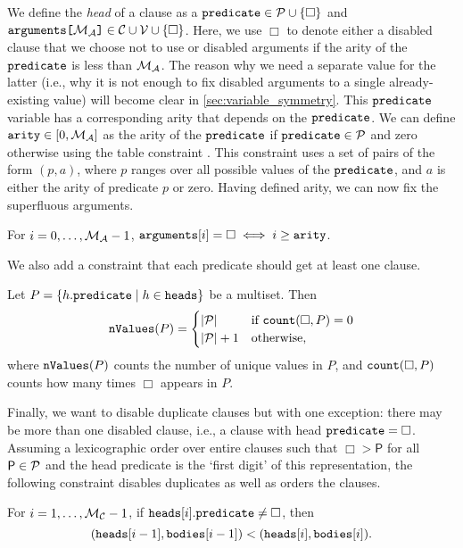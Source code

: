 We define the \emph{head} of a clause as a $\texttt{\textup{predicate}} \in \mathcal{P}{}
\cup \{ \Box \}$ and $\texttt{\textup{{arguments}[}}{\mathcal{M}_{\mathcal{A}}{}}\texttt{\textup{]}} \in {\mathcal{C}{} \cup
  \mathcal{V}{}} \cup \{ \Box \}$. Here, we use $\Box$ to denote either a
disabled clause that we choose not to use or disabled arguments if the arity of
the $\texttt{\textup{predicate}}$ is less than $\mathcal{M}_{\mathcal{A}}{}$. The reason why we need a
separate value for the latter (i.e., why it is not enough to fix disabled
arguments to a single already-existing value) will become clear in
\cref{sec:variable_symmetry}. This $\texttt{\textup{predicate}}$ variable has a
corresponding arity that depends on the $\texttt{\textup{predicate}}$. We can
define $\texttt{\textup{arity}} \in [0, \mathcal{M}_{\mathcal{A}}{}]$ as the arity of the
$\texttt{\textup{predicate}}$ if $\texttt{\textup{predicate}} \in \mathcal{P}{}$ and zero
otherwise using the table constraint \citep{DBLP:conf/cpaior/MairyDL15}. This
constraint uses a set of pairs of the form $(p, a)$, where $p$ ranges over all
possible values of the $\texttt{\textup{predicate}}$, and $a$ is either the arity of
predicate $p$ or zero. Having defined arity, we can now fix the superfluous
arguments.
\begin{constraint} \label{constr:arity}
  For $i = 0, \dots, \mathcal{M}_{\mathcal{A}}{} - 1$, $\texttt{\textup{arguments}}[i] = \Box \iff i
  \ge \texttt{\textup{arity}}$.
\end{constraint}
We also add a constraint that each predicate should get at least one clause.
\begin{constraint}
  Let $P = \{ h.\texttt{\textup{predicate}} \mid h \in \texttt{\textup{heads}} \}$ be a
  multiset. Then
  \[
    \texttt{\textup{nValues}}(P) = \begin{cases}
      |\mathcal{P}{}| & \text{if } \texttt{\textup{count}}(\Box, P) = 0 \\
      |\mathcal{P}{}| + 1 & \text{otherwise,}
    \end{cases}
  \]
  where $\texttt{\textup{nValues}}(P)$ counts the number of unique values in $P$, and
  $\texttt{\textup{count}}(\Box, P)$ counts how many times $\Box$ appears in $P$.
\end{constraint}
Finally, we want to disable duplicate clauses but with one exception: there may
be more than one disabled clause, i.e., a clause with head $\texttt{\textup{predicate}}
= \Box$. Assuming a lexicographic order over entire clauses such that $\Box >
\mathsf{P}$ for all $\mathsf{P} \in \mathcal{P}{}$ and the head predicate is the
`first digit' of this representation, the following constraint disables
duplicates as well as orders the clauses.
\begin{constraint}
  For $i = 1, \dots, \mathcal{M}_{\mathcal{C}}{} - 1$, if $\texttt{\textup{heads}}[i].\texttt{\textup{predicate}}
  \ne \Box$, then
  \[
    (\texttt{\textup{heads}}[i-1], \texttt{\textup{bodies}}[i-1]) < (\texttt{\textup{heads}}[i],
    \texttt{\textup{bodies}}[i]).
  \]
\end{constraint}

